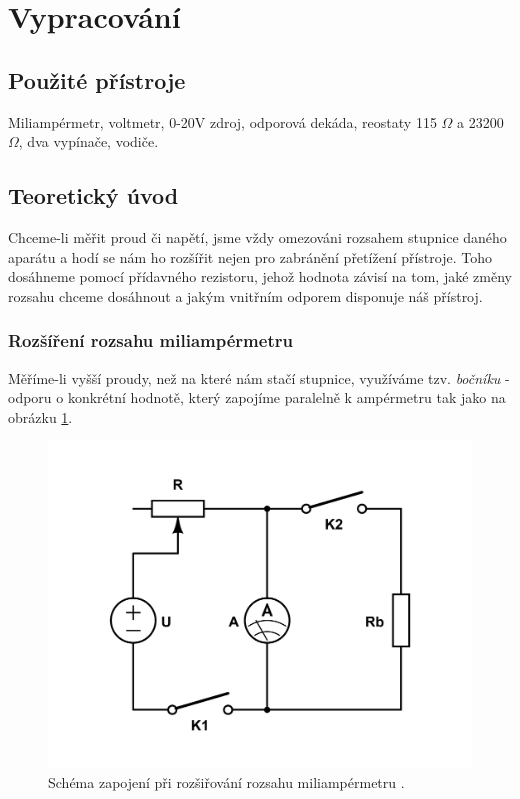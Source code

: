 \documentclass[english]{article}
\begin{document}
\section{Vypracování}

\subsection{Použité přístroje}
Miliampérmetr, voltmetr, 0-20V zdroj, odporová dekáda, reostaty 115 $\Omega$ a 23200 $\Omega$, dva vypínače, vodiče.

\subsection{Teoretický úvod}
Chceme-li měřit proud či napětí, jsme vždy omezováni rozsahem stupnice daného aparátu a hodí se nám ho rozšířit nejen pro zabránění přetížení přístroje. Toho dosáhneme pomocí přídavného rezistoru, jehož hodnota závisí na tom, jaké změny rozsahu chceme dosáhnout a jakým vnitřním odporem disponuje náš přístroj. 

\subsubsection{Rozšíření rozsahu miliampérmetru}
Měříme-li vyšší proudy, než na které nám stačí stupnice, využíváme tzv. \emph{bočníku} - odporu o konkrétní hodnotě, který zapojíme paralelně k ampérmetru tak jako na obrázku \ref{fig:s_rozsah_a}.   

\begin{figure}[h!]
\centering
  \includegraphics[scale=0.4, trim=0cm 2cm 0cm 2cm, clip=true]{att/7_s_rozsah_a.pdf}
  \caption{Schéma zapojení při rozšiřování rozsahu miliampérmetru  \cite{bib:repo_2}.}
  \label{fig:s_rozsah_a}
\end{figure}
\end{document}

